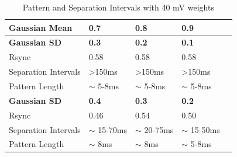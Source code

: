 \documentclass[12pt,a4paper]{article}
\begin{document}
            \begin{table}[h]
                \centering
                \caption{Pattern and Separation Intervals with 40 mV weights}
                \label{table1}
                
                \begin{tabular}{*5l}    \toprule
                    \textbf{Gaussian Mean} & \textbf{0.7} & \textbf{0.8} & \textbf{0.9} \\\midrule
                    \textbf{Gaussian SD} & \textbf{0.3} & \textbf{0.2} & \textbf{0.1} \\ 
                    Rsync & 0.58 & 0.58 & 0.58\\
                    Separation Intervals & \textgreater 150ms & \textgreater 150ms & \textgreater 150ms\\
                    Pattern Length & $\sim$ 5-8ms & $\sim$ 5-8ms & $\sim$ 5-8ms\\\midrule
                    \textbf{Gaussian SD} & \textbf{0.4} & \textbf{0.3} & \textbf{0.2} \\ 
                    Rsync & 0.46 & 0.54 & 0.50\\
                    Separation Intervals & $\sim$ 15-70ms   & $\sim$ 20-75ms & $\sim$ 15-50ms\\
                    Pattern Length & $\sim$ 8ms & $\sim$ 8ms & $\sim$ 5-8ms\\\bottomrule
                    \hline
                \end{tabular}
            \end{table}
\end{document}
